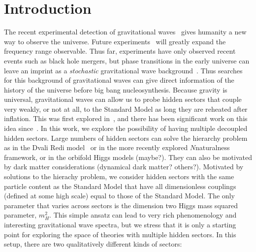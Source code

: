 \documentclass[nofootinbib,twocolumn,preprintnumbers]{revtex4-1}
\begin{document}
\section{Introduction} 
\label{sec:intro} 
The recent experimental detection of gravitational waves~\cite{Abbott:2016blz} gives humanity a new way to observe the universe. Future experiments~\cite{Crowder:2005nr,Harry:2006fi,Sathyaprakash:2012jk,2017arXiv170200786A,Seto:2001qf,Sato:2017dkf,Janssen:2014dka} will greatly expand the frequency range observable. Thus far, experiments have only observed recent events such as black hole mergers, but phase transitions in the early universe can leave an imprint as a \textit{stochastic} gravitational wave background~\cite{Caprini:2015zlo,Witten:1984rs,Hogan:1984hx,Hogan:1986qda,PhysRevLett.65.3080,Mazumdar:2018dfl}. Thus searches for this background of gravitational waves can give direct information of the history of the universe before big bang nucleosynthesis. 
Because gravity is universal, gravitational waves can allow us to probe hidden sectors that couple very weakly, or not at all, to the Standard Model as long they are reheated after inflation. This was first explored in~\cite{Schwaller:2015tja}, and there has been significant work on this idea since~\cite{Breitbach:2018ddu,Bertone:2019irm,Caputo:2019wsd,Helmboldt:2019pan,Fairbairn:2019xog,Bai:2018dxf,Baldes:2018emh,Croon:2018erz,Geller:2018mwu,Heikinheimo:2018esa,Aoki:2017aws,Bernal:2017kxu,Acharya:2017szw,Tsumura:2017knk,Dienes:2016vei,Hardy:2016mns,Addazi:2016fbj,Jaeckel:2016jlh}. 
In this work, we explore the possibility of having multiple decoupled hidden sectors. Large numbers of hidden sectors can solve the hierarchy problem as in the Dvali Redi model~\cite{Dvali:2009ne} or in the more recently explored $N$naturalness~\cite{Arkani-Hamed:2016rle} framework, or in the orbifold Higgs models (maybe?\cite{}). They can also be motivated by dark matter considerations (dynamical dark matter? others?). 
Motivated by solutions to the hierachy problem, we consider hidden sectors with the same particle content as the Standard Model that have all dimensionless couplings (defined at some high scale) equal to those of the Standard Model. The only parameter that varies across sectors is the dimension two Higgs mass squared parameter, $m_H^2$. This simple ansatz can lead to very rich phenomenology and interesting gravitational wave spectra, but we stress that it is only a starting point for exploring the space of theories with multiple hidden sectors.
In this setup, there are two qualitatively different kinds of sectors:
\end{document}
